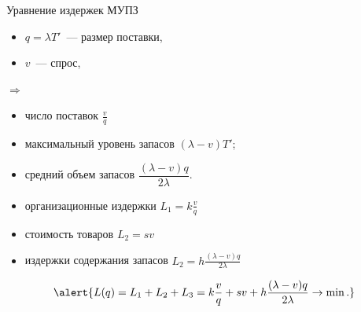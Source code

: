 \documentclass[unicode,11pt,notheorems,xcolor=table]{beamer}
\begin{document}
    \begin{frame}{Уравнение издержек МУПЗ}
        \begin{minipage}{0.48\textwidth}
            \begin{itemize}
                \item $q=\lambda T'$~--- размер поставки,
                \item $v$~--- спрос,
            \end{itemize}    
        \end{minipage}$\Rightarrow$
        \begin{minipage}{0.47\textwidth}
            \begin{itemize}
                \item число поставок $\frac{v}{q}$
                \item максимальный уровень запасов $(\lambda-v)T'$;
                \item средний объем запасов $\dfrac{(\lambda-v)q}{2\lambda}$.
            \end{itemize}
        \end{minipage}    
    
        \bigskip
        \begin{itemize}
            \item организационные издержки \alert{$L_1= k\frac{v}{q}$}
            \item стоимость товаров \alert{$L_2=sv$}
            \item издержки содержания запасов \alert{$L_2=h\frac{(\lambda-v)q}{2\lambda}$}
        \end{itemize}
    
        \bigskip
        $$
            \alert{L(q) 
            = L_1 + L_2 + L_3 
            = k\frac{v}{q} + sv + h\frac{(\lambda-v)q}{2\lambda} \to \min.}
        $$
    
    \end{frame}    
    
\end{document}

